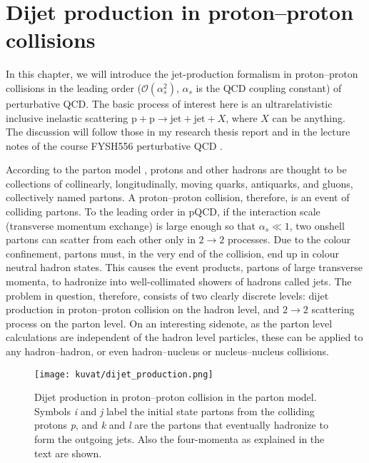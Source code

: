 \documentclass[a4paper, twoside, english, 12pt]{report}
\begin{document}
\cleardoublepage
\chapter{Dijet production in proton--proton collisions}\label{S:jet_production}



In this chapter, we will introduce the jet-production formalism in proton--proton collisions in the leading order ($\mathcal{O}(\alpha_s^2)$, $\alpha_s$ is the QCD coupling constant) of perturbative QCD. The basic process of interest here is an ultrarelativistic inclusive inelastic scattering $\text{p}+\text{p}\rightarrow\text{jet}+\text{jet}+X$, where $X$ can be anything. The discussion will follow those in my research thesis report \cite{erkka} and in the lecture notes of the course FYSH556 perturbative QCD \cite{pqcd}.

According to the parton model \cite{feynman, bjorken}, protons and other hadrons are thought to be collections of collinearly, longitudinally, moving quarks, antiquarks, and gluons, collectively named partons. A proton--proton collision, therefore, is an event of colliding partons. To the leading order in pQCD, if the interaction scale (transverse momentum exchange) is large enough so that $\alpha_s \ll 1$, two onshell partons can scatter from each other only in $2\rightarrow2$ processes. Due to the colour confinement, partons must, in the very end of the collision, end up in colour neutral hadron states. This causes the event products, partons of large transverse momenta, to hadronize into well-collimated showers of hadrons called jets. The problem in question, therefore, consists of two clearly discrete levels: dijet production in proton--proton collision on the hadron level, and $2\rightarrow2$ scattering process on the parton level. On an interesting sidenote, as the parton level calculations are independent of the hadron level particles, these can be applied to any hadron--hadron, or even hadron--nucleus or nucleus--nucleus collisions.


\begin{figure}[b!]
	\centering
	\texttt{[image: kuvat/dijet\_production.png]}
	\caption{Dijet production in proton--proton collision in the parton model. Symbols \textit{i} and \textit{j} label the initial state partons from the colliding protons \textit{p}, and \textit{k} and \textit{l} are the partons that eventually hadronize to form the outgoing jets. Also the four-momenta as explained in the text are shown.}
	\label{F:dijet_production}
\end{figure}
\end{document}
